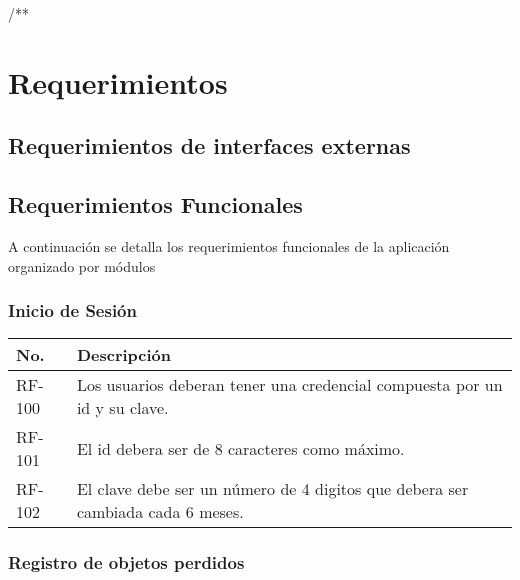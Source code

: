 /**\chapter{Requerimientos}

\section{Requerimientos de interfaces externas}

\section{Requerimientos Funcionales}

A continuación se detalla los requerimientos funcionales de la aplicación organizado por módulos

\subsection{Inicio de Sesión}


	\begin{table}[h!]	
		\begin{tabular}{ |p{2cm}|p{12cm}| }	\hline
			
			\rowcolor{gray!50}  \textbf{No.}  &  \textbf{Descripción} \\ \hline
			
			RF-100&Los usuarios deberan tener una credencial compuesta por un id y su clave.  \\	\hline
			
			RF-101&El id debera ser de 8 caracteres como máximo.  \\ \hline
			
			RF-102&El clave debe ser un número de 4 digitos que debera ser cambiada cada 6 meses.  \\ \hline	
		
		\end{tabular}
	\end{table}	


\subsection{Registro de objetos perdidos}

